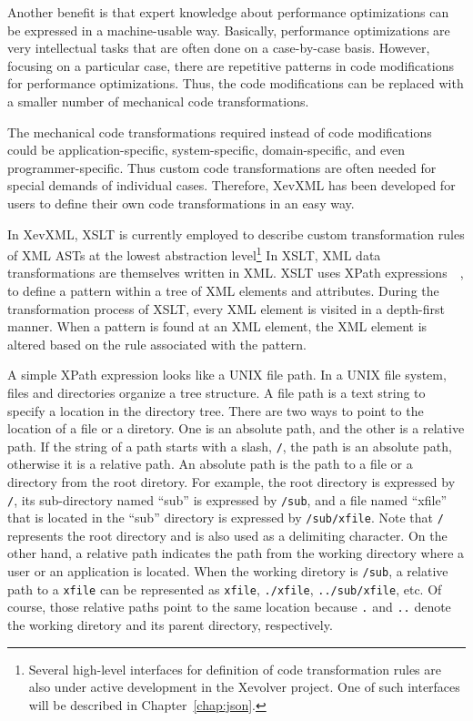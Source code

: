 Another benefit is that expert knowledge about performance optimizations
can be expressed in a machine-usable way.  Basically, performance
optimizations are very intellectual tasks that are often done on a
case-by-case basis.  However, focusing on a particular case, there are
repetitive patterns in code modifications for performance
optimizations. Thus, the code modifications can be replaced with a
smaller number of mechanical code transformations.

The mechanical code transformations required instead of code
modifications could be application-specific, system-specific,
domain-specific, and even programmer-specific. Thus custom code
transformations are often needed for special demands of individual
cases.  Therefore, XevXML has been developed for users to define their
own code transformations in an easy way.

In XevXML, XSLT is currently employed to describe custom
transformation rules of XML ASTs at the lowest abstraction
level\footnote{Several high-level interfaces for definition of code
transformation rules are also under active development in the Xevolver
project.  One of such interfaces will be described in
Chapter~\ref{chap:json}.}  In XSLT, XML data transformations are
themselves written in XML.  XSLT uses XPath
expressions~\cite{xpath}~\cite{Kay08xslt}, to define a pattern within
a tree of XML elements and attributes.  During the transformation
process of XSLT, every XML element is visited in a depth-first manner.
When a pattern is found at an XML element, the XML element is altered
based on the rule associated with the pattern.

A simple XPath expression looks like a UNIX file path. In a UNIX file
system, files and directories organize a tree structure. A file path is
a text string to specify a location in the directory tree.  There are
two ways to point to the location of a file or a diretory.  One is an
absolute path, and the other is a relative path.  If the string of a
path starts with a slash, \texttt{/}, the path is an absolute path,
otherwise it is a relative path. An absolute path is the path to a file
or a directory from the root diretory. For example, the root directory
is expressed by \texttt{/}, its sub-directory named ``sub'' is expressed
by \texttt{/sub}, and a file named ``xfile'' that is located in the
``sub'' directory is expressed by \texttt{/sub/xfile}.  Note that
\texttt{/} represents the root directory and is also used as a
delimiting character.  On the other hand, a relative path indicates the
path from the working directory where a user or an application is
located. When the working diretory is \texttt{/sub}, a relative path to
a \texttt{xfile} can be represented as \texttt{xfile}, \texttt{./xfile},
\texttt{../sub/xfile}, etc.  Of course, those relative paths point to
the same location because \texttt{.} and \texttt{..} denote the working
diretory and its parent directory, respectively.

